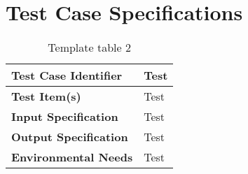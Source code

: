 
\chapter{Test Case Specifications}
\blindtext

\begin{table}[h]
	\begin{tabularx}{\textwidth}{l X}
		\hline
		\textbf{Test Case Identifier}	&	Test\\	\hline
		\textbf{Test Item(s)}			&	Test\\	\hline
		\textbf{Input Specification}	&	Test\\	\hline
		\textbf{Output Specification}	&	Test\\	\hline
		\textbf{Environmental Needs}	&	Test\\	\hline
	\end{tabularx}
	\captionsetup{textformat=empty,labelformat=blank}
	\caption{Template table 2}
	\label{table:template-table-2}
\end{table}